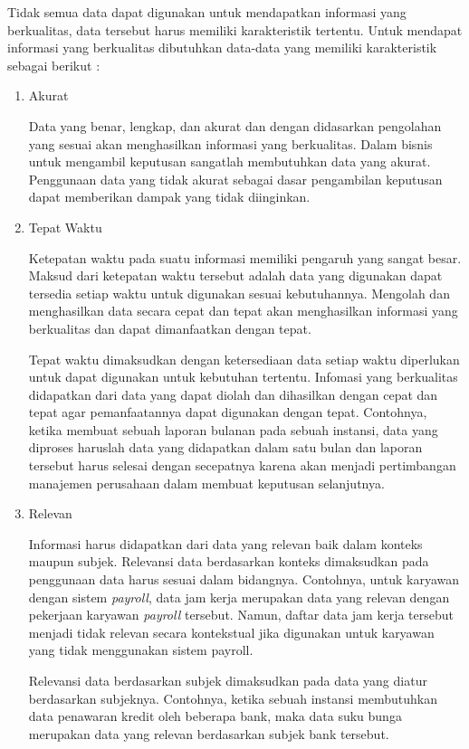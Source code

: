 	Tidak semua data dapat digunakan untuk mendapatkan informasi yang berkualitas, data tersebut harus memiliki karakteristik tertentu. Untuk mendapat informasi yang berkualitas dibutuhkan data-data yang memiliki karakteristik sebagai berikut \citep{Kroenke2009}:
\begin{enumerate}
	\item Akurat

	Data yang benar, lengkap, dan akurat dan dengan didasarkan pengolahan yang sesuai akan menghasilkan informasi yang berkualitas. Dalam bisnis untuk mengambil keputusan sangatlah membutuhkan data yang akurat. Penggunaan data yang tidak akurat sebagai dasar pengambilan keputusan dapat memberikan dampak yang tidak diinginkan.

	\item Tepat Waktu

	Ketepatan waktu pada suatu informasi memiliki pengaruh yang sangat besar. Maksud dari ketepatan waktu tersebut adalah data yang digunakan dapat tersedia setiap waktu untuk digunakan sesuai kebutuhannya. Mengolah dan menghasilkan data secara cepat dan tepat akan menghasilkan informasi yang berkualitas dan dapat dimanfaatkan dengan tepat.

 Tepat waktu dimaksudkan dengan ketersediaan data setiap waktu diperlukan untuk dapat digunakan untuk kebutuhan tertentu. Infomasi yang berkualitas didapatkan dari data yang dapat diolah dan dihasilkan dengan cepat dan tepat agar pemanfaatannya dapat digunakan dengan tepat. Contohnya, ketika membuat sebuah laporan bulanan pada sebuah instansi, data yang diproses haruslah data yang didapatkan dalam satu bulan dan laporan tersebut harus selesai dengan secepatnya karena akan menjadi pertimbangan manajemen perusahaan dalam membuat keputusan selanjutnya.

	\item Relevan

	Informasi harus didapatkan dari data yang relevan baik dalam konteks maupun subjek. Relevansi data berdasarkan konteks dimaksudkan pada penggunaan data harus sesuai dalam bidangnya. Contohnya, untuk karyawan dengan sistem \textit{payroll}, data jam kerja merupakan data yang relevan dengan pekerjaan karyawan \textit{payroll} tersebut. Namun, daftar data jam kerja tersebut menjadi tidak relevan secara kontekstual jika digunakan untuk karyawan yang tidak menggunakan sistem payroll.

	Relevansi data berdasarkan subjek dimaksudkan pada data yang diatur berdasarkan subjeknya. Contohnya, ketika sebuah instansi membutuhkan data penawaran kredit oleh beberapa bank, maka data suku bunga merupakan data yang relevan berdasarkan subjek bank tersebut.


\end{enumerate}
